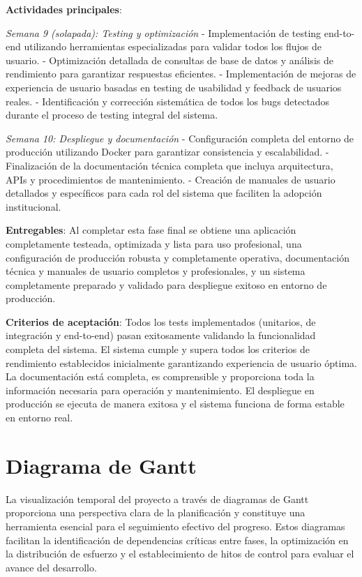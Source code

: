 \documentclass[12pt,a4paper,oneside]{report}
\begin{document}
\textbf{Actividades principales}:

\emph{Semana 9 (solapada): Testing y optimización} - Implementación de testing end-to-end utilizando herramientas especializadas para validar todos los flujos de usuario. - Optimización detallada de consultas de base de datos y análisis de rendimiento para garantizar respuestas eficientes. - Implementación de mejoras de experiencia de usuario basadas en testing de usabilidad y feedback de usuarios reales. - Identificación y corrección sistemática de todos los bugs detectados durante el proceso de testing integral del sistema.

\emph{Semana 10: Despliegue y documentación} - Configuración completa del entorno de producción utilizando Docker para garantizar consistencia y escalabilidad. - Finalización de la documentación técnica completa que incluya arquitectura, APIs y procedimientos de mantenimiento. - Creación de manuales de usuario detallados y específicos para cada rol del sistema que faciliten la adopción institucional.

\textbf{Entregables}: Al completar esta fase final se obtiene una aplicación completamente testeada, optimizada y lista para uso profesional, una configuración de producción robusta y completamente operativa, documentación técnica y manuales de usuario completos y profesionales, y un sistema completamente preparado y validado para despliegue exitoso en entorno de producción.

\textbf{Criterios de aceptación}: Todos los tests implementados (unitarios, de integración y end-to-end) pasan exitosamente validando la funcionalidad completa del sistema. El sistema cumple y supera todos los criterios de rendimiento establecidos inicialmente garantizando experiencia de usuario óptima. La documentación está completa, es comprensible y proporciona toda la información necesaria para operación y mantenimiento. El despliegue en producción se ejecuta de manera exitosa y el sistema funciona de forma estable en entorno real.

\section{Diagrama de Gantt}\label{diagrama-de-gantt}

La visualización temporal del proyecto a través de diagramas de Gantt proporciona una perspectiva clara de la planificación y constituye una herramienta esencial para el seguimiento efectivo del progreso. Estos diagramas facilitan la identificación de dependencias críticas entre fases, la optimización en la distribución de esfuerzo y el establecimiento de hitos de control para evaluar el avance del desarrollo.
\end{document}
